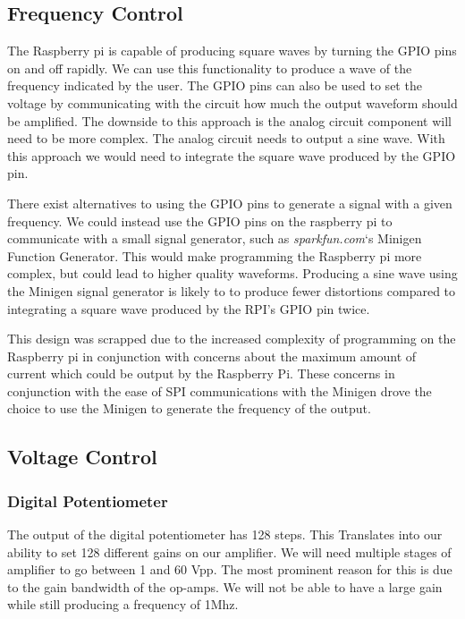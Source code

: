 \documentclass{article}	%
\begin{document}
\begin{multicols}{2}
\subsection{Frequency Control}
The Raspberry pi is capable of producing square waves by turning the GPIO pins on and off rapidly. We can use this functionality to produce a wave of the frequency indicated by the user. The GPIO pins can also be used to set the voltage by communicating with the circuit how much the output waveform should be amplified. The downside to this approach is the analog circuit component will need to be more complex. The analog circuit needs to output a sine wave. With this approach we would need to integrate the square wave produced by the GPIO pin.

There exist alternatives to using the GPIO pins to generate a signal with a given frequency. We could instead use the GPIO pins on the raspberry pi to communicate with a small signal generator, such as \textit{sparkfun.com}‘s Minigen Function Generator. This would make programming the Raspberry pi more complex, but could lead to higher quality waveforms. Producing a sine wave using the Minigen signal generator is likely to to produce fewer distortions compared to integrating a square wave produced by the RPI’s GPIO pin twice. 

This design was scrapped due to the increased complexity of programming on
the Raspberry pi in conjunction with
concerns about the maximum amount of current which could be output
by the Raspberry Pi.
These concerns in conjunction with the ease of SPI communications
with the Minigen drove the choice to use the Minigen to generate the
frequency of the output.

\subsection{Voltage Control}
\subsubsection{Digital Potentiometer}
The output of the digital potentiometer has 128 steps. This Translates into our ability to set 128 different gains on our amplifier. We will need multiple stages of amplifier to go between 1 and 60 Vpp. The most prominent reason for this is due to the gain bandwidth of the op-amps. We will not be able to have a large gain while still producing a frequency of 1Mhz.


\end{multicols}
\end{document}
